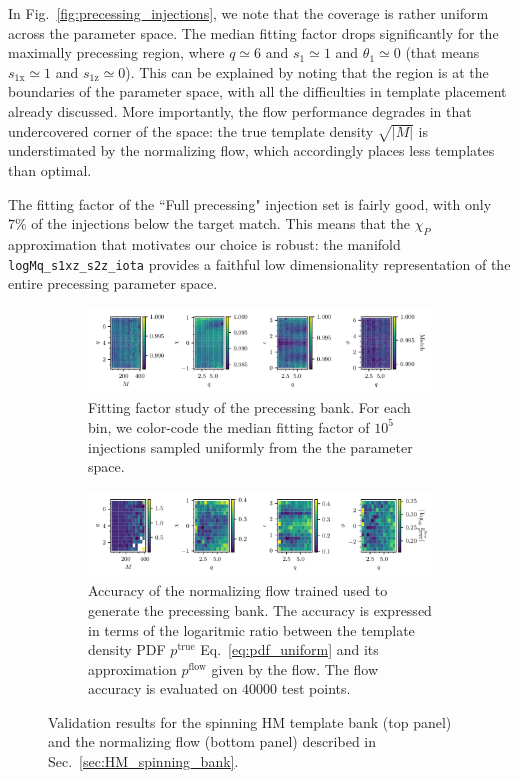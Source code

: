 \documentclass[twocolumn,showpacs,preprintnumbers,nofootinbib,prd,
superscriptaddress,10pt]{revtex4-2}
\begin{document}
In Fig.~\ref{fig:precessing_injections}, we note that the coverage is rather uniform across the parameter space. The median fitting factor drops significantly for the maximally precessing region, where $q \simeq 6$ and $s_1 \simeq 1$ and $\theta_1 \simeq 0$ (that means $s_\text{1x} \simeq 1$ and $s_\text{1z} \simeq 0$).
This can be explained by noting that the region is at the boundaries of the parameter space, with all the difficulties in template placement already discussed. More importantly, the flow performance degrades in that undercovered corner of the space: the true template density $\sqrt{|M|}$ is understimated by the normalizing flow, which accordingly places less templates than optimal.

The fitting factor of the ``Full precessing" injection set is fairly good, with only $7\%$ of the injections below the target match. This means that the $\chi_P$ approximation that motivates our choice is robust: the manifold \texttt{logMq\_s1xz\_s2z\_iota} provides a faithful low dimensionality representation of the entire precessing parameter space.

\begin{figure}[t]
	\centering
	\begin{subfigure}[t]{\textwidth}
		\includegraphics[scale = 1.]{HM_injections}
		\caption{Fitting factor study of the precessing bank. For each bin, we color-code the median fitting factor of $10^5$ injections sampled uniformly from the the parameter space.}
		\label{fig:HM_fitting_factor}
	\end{subfigure}
	\begin{subfigure}[t]{\textwidth}
		\includegraphics[scale = 1.]{HM_flow_accuracy}
		\caption{Accuracy of the normalizing flow trained used to generate the precessing bank. The accuracy is expressed in terms of the logaritmic ratio between the template density PDF $p^\text{true}$ Eq.~\eqref{eq:pdf_uniform} and its approximation $p^\text{flow}$ given by the flow. The flow accuracy is evaluated on $40000$ test points.}
		\label{fig:HM_flow}
	\end{subfigure}
	\caption{Validation results for the spinning HM template bank (top panel) and the normalizing flow (bottom panel) described in Sec.~\ref{sec:HM_spinning_bank}.}
	\label{fig:HM_injections}
\end{figure}
\end{document}
